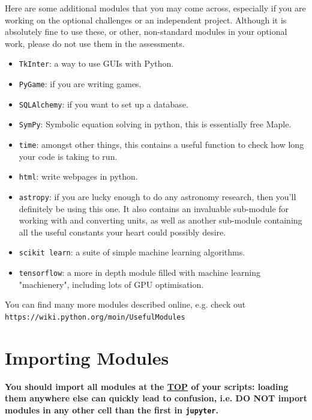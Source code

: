 \newpage
\noindent Here are some additional modules that you may come across, especially if you are working on the optional challenges or an independent project. Although it is absolutely fine to use these, or other, non-standard modules in your optional work, please do not use them in the assessments.
\begin{itemize}
\item {\tt TkInter}: a way to use GUIs with Python.
\item {\tt PyGame}: if you are writing games.
\item {\tt SQLAlchemy}: if you want to set up a database.
\item {\tt SymPy}: Symbolic equation solving in python, this is essentially free Maple.
\item {\tt time}: amongst other things, this contains a useful function to check how long your code is taking to run.
\item  {\tt html}: write webpages in python.
\item {\tt astropy}: if you are lucky enough to do any astronomy research, then you'll definitely be using this one. It also contains an invaluable sub-module for working with and converting units, as well as another sub-module containing all the useful constants your heart could possibly desire.
\item \texttt{scikit learn}: a suite of simple machine learning algorithms.
\item \texttt{tensorflow}: a more in depth module filled with machine learning "machienery", including lots of GPU optimisation.
\end{itemize}

\noindent You can find many more modules described online, e.g. check out \\ {\tt https://wiki.python.org/moin/UsefulModules}

\section{Importing Modules}
\label{modload}
{\bf You should import all modules at the \underline{TOP} of your scripts: loading them anywhere else can quickly lead to confusion, i.e. DO NOT import modules in any other cell than the first in \texttt{jupyter}.}

